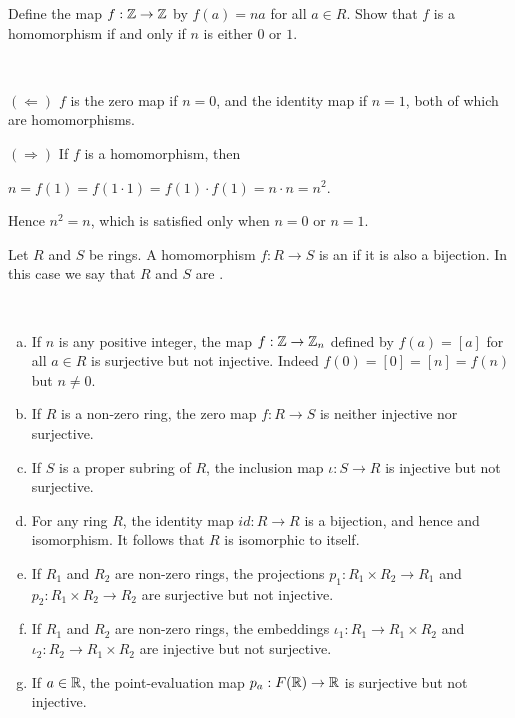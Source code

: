 \documentclass[11pt,fleqn,dvipsnames,usenames]{article}
\begin{document}
%
\begin{example}
Define the map $f:\mathbb{Z}\to\mathbb{Z}$ by $f(a) = na$ for all $a\in R$.  Show that $f$ is a homomorphism if and only if $n$ is either $0$ or $1$.
\end{example}
%
\begin{solution}~

$(\Leftarrow)$ $f$ is the zero map if $n = 0$, and the identity map if $n=1$, both of which are homomorphisms.
\vsp

$(\Rightarrow)$ If $f$ is a homomorphism, then
\begin{center}
$n = f(1) = f(1\cdot 1) = f(1)\cdot f(1) = n\cdot n = n^2$.
\end{center}
Hence $n^2 = n$, which is satisfied only when $n = 0$ or $n=1$.
\end{solution}
%
\begin{definition}
Let $R$ and $S$ be rings.  A homomorphism $f:R\to S$ is an  if it is also a bijection.  In this case we say that $R$ and $S$ are .
\end{definition}
%
\begin{examples}~
\begin{enumerate}[(a)]
\item If $n$ is any positive integer, the map $f:\mathbb{Z}\to\mathbb{Z}_{n}$ defined by $f(a) = [a]$ for all $a\in R$ is surjective but not injective.  Indeed $f(0) = [0] = [n] = f(n)$ but $n\neq 0$.
\item If $R$ is a non-zero ring, the zero map $f:R\to S$ is neither injective nor surjective.
\item If $S$ is a proper subring of $R$, the inclusion map $\iota:S\to R$ is injective but not surjective.
\item For any ring $R$, the identity map $id:R\to R$ is a bijection, and hence and isomorphism.  It follows that $R$ is isomorphic to itself.
\item If $R_{1}$ and $R_{2}$ are non-zero rings, the projections $p_{1}:R_{1}\times R_{2}\to R_{1}$ and $p_{2}:R_{1}\times R_{2}\to R_{2}$ are surjective but not injective.
\item If $R_{1}$ and $R_{2}$ are non-zero rings, the embeddings $\iota_1:R_1\to R_{1}\times R_{2}$ and $\iota_2:R_2\to R_{1}\times R_{2}$ are injective but not surjective.
\item If $a\in \mathbb{R}$, the point-evaluation map $p_{a}:F(\mathbb{R})\to \mathbb{R}$ is surjective but not injective.
\end{enumerate}
\end{examples}
\end{document}

